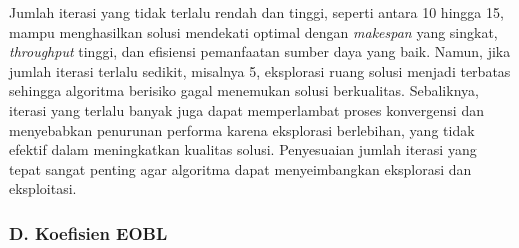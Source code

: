 Jumlah iterasi yang tidak terlalu rendah dan tinggi, seperti antara 10 hingga 15, mampu menghasilkan solusi mendekati optimal dengan \textit{makespan} yang singkat, \textit{throughput} tinggi, dan efisiensi pemanfaatan sumber daya yang baik. Namun, jika jumlah iterasi terlalu sedikit, misalnya 5, eksplorasi ruang solusi menjadi terbatas sehingga algoritma berisiko gagal menemukan solusi berkualitas. Sebaliknya, iterasi yang terlalu banyak juga dapat memperlambat proses konvergensi dan menyebabkan penurunan performa karena eksplorasi berlebihan, yang tidak efektif dalam meningkatkan kualitas solusi. Penyesuaian jumlah iterasi yang tepat sangat penting agar algoritma dapat menyeimbangkan eksplorasi dan eksploitasi.

\newpage

\subsubsection{D. Koefisien EOBL}

